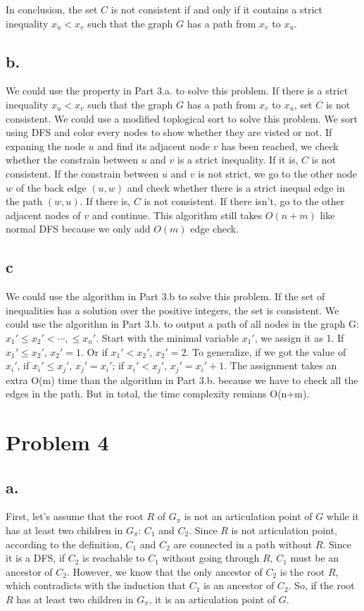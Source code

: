 \documentclass[twoside,11pt]{homework}
\begin{document}
In conclusion, the set $C$ is not consistent if and only if it contains a strict inequality $x_u < x_v$ such that the graph $G$ has a path from $x_v$ to $x_u$.

\subsection*{b.}
We could use the property in Part 3.a. to solve this problem.
If there is  a strict inequality $x_u < x_v$ such that the graph $G$ has a path from $x_v$ to $x_u$, set $C$ is not consistent.
We could use a modified toplogical sort to solve this problem.
We sort using DFS and color every nodes to show whether they are visted or not.
If expaning the node $u$ and find its adjacent node $v$ has been reached, we check whether the constrain between $u$ and $v$ is a strict inequality.
If it is,  $C$ is not consistent.
If the constrain between $u$ and $v$ is not strict, we go to the other node $w$ of the back edge $(u, w)$ and check whether there is a strict inequal edge in the path $(w, u)$. 
If there is, $C$ is not consistent.
If there isn't, go to the other adjacent nodes of $v$ and continue.
This algorithm still takes $O(n+m)$ like normal DFS because we only add $O(m)$ edge check.



\subsection*{c}
We could use the algorithm in Part 3.b to solve this problem.
If the set of inequalities has a solution over the positive integers, the set is consistent.
We could use the algorithm in Part 3.b. to output a path of all nodes in the graph G: $x_1' \le x_2'< \cdots, \le x_n'$.
Start with the minimal variable $x_1'$, we assign it as 1.
If $x_1' \le x_2'$, $x_2' = 1$.
Or if $x_1' < x_2'$, $x_2' = 2$.
To generalize, if we got the value of $x_i'$, if $x_i' \le x_j'$, $x_j' = x_i'$;
if $x_i' < x_j'$, $x_j' = x_i' + 1$.
The assignment takes an extra O(m) time than the algorithm in Part 3.b. because we have to check all the edges in the path.
But in total, the time complexity remians O(n+m).

\section*{Problem 4}
\subsection*{a.}
First, let's assume that the root $R$ of $G_{\pi}$ is not an articulation point of $G$ while it has at least two children in $G_{\pi}$: $C_1$ and $C_2$.
Since $R$ is not articulation point, according to the definition, $C_1$ and $C_2$ are connected in a path without $R$.
Since it is a DFS, if $C_2$ is reachable to $C_1$ without going through $R$, $C_1$ must be an ancestor
of $C_2$.
However, we know that the only ancestor of $C_2$ is the root $R$, which contradicts with the induction that $C_1$ is an ancestor of $C_2$.
So, if  the root $R$ has at least two children in $G_{\pi}$, it is an articulation point of $G$.
\end{document}
